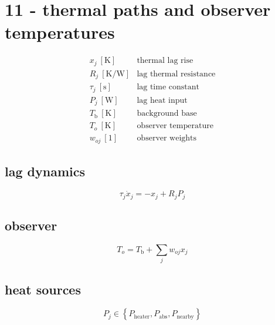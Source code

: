 \section*{11 - thermal paths and observer temperatures}

\[
\begin{array}{ll}x_j\ [\mathrm K]&\text{thermal lag rise}\\[0.6em]R_j\ [\mathrm{K/W}]&\text{lag thermal resistance}\\[0.6em]\tau_j\ [\mathrm s]&\text{lag time constant}\\[0.6em]P_j\ [\mathrm W]&\text{lag heat input}\\[0.6em]T_{\mathrm b}\ [\mathrm K]&\text{background base}\\[0.6em]T_o\ [\mathrm K]&\text{observer temperature}\\[0.6em]w_{oj}\ [1]&\text{observer weights}\end{array}
\]

\subsection*{lag dynamics}
\[
\displaystyle \tau_j\dot x_j=-x_j+R_jP_j
\]

\subsection*{observer}
\[
\displaystyle T_o=T_{\mathrm b}+\sum_jw_{oj}x_j
\]

\subsection*{heat sources}
\[
\displaystyle P_j\in\left\{P_{\mathrm{heater}},P_{\mathrm{abs}},P_{\mathrm{nearby}}\right\}
\]
